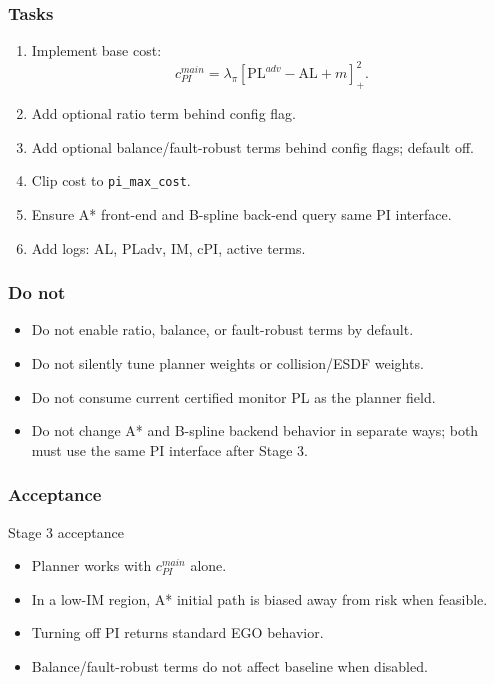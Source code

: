 \documentclass[11pt,a4paper]{article}
\newcommand{\PL}{\mathrm{PL}}
\newcommand{\AL}{\mathrm{AL}}
\begin{document}
\subsubsection{Tasks}
\begin{enumerate}
\item Implement base cost:
  \[
    c_{PI}^{main}=\lambda_\pi[\PL^{adv}-\AL+m]^2_+.
  \]
\item Add optional ratio term behind config flag.
\item Add optional balance/fault-robust terms behind config flags; default off.
\item Clip cost to \texttt{pi\_max\_cost}.
\item Ensure A* front-end and B-spline back-end query same PI interface.
\item Add logs: AL, PLadv, IM, cPI, active terms.
\end{enumerate}

\subsubsection{Do not}
\begin{itemize}
\item Do not enable ratio, balance, or fault-robust terms by default.
\item Do not silently tune planner weights or collision/ESDF weights.
\item Do not consume current certified monitor PL as the planner field.
\item Do not change A* and B-spline backend behavior in separate ways; both must use the same PI interface after Stage 3.
\end{itemize}

\subsubsection{Acceptance}
\begin{acceptbox}{Stage 3 acceptance}
\begin{itemize}
  \item Planner works with $c_{PI}^{main}$ alone.
  \item In a low-IM region, A* initial path is biased away from risk when feasible.
  \item Turning off PI returns standard EGO behavior.
  \item Balance/fault-robust terms do not affect baseline when disabled.
\end{itemize}
\end{acceptbox}
\end{document}
